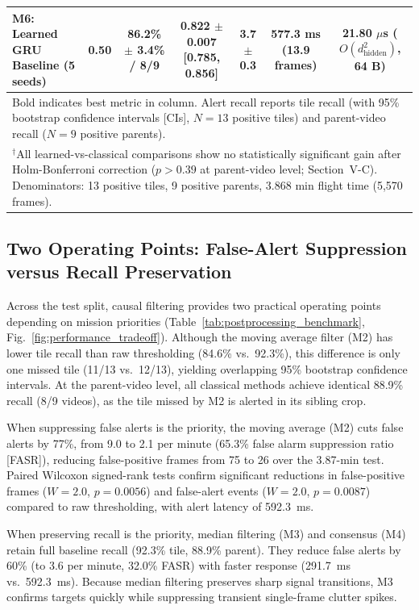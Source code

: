 \documentclass[conference]{IEEEtran}
\begin{document}
\begin{table}[t]
{\begin{tabular}{lcccccc}
M6: Learned GRU Baseline (5 seeds)     & 0.50 & 86.2\% $\pm$ 3.4\% / 8/9                     & \textbf{0.822 $\pm$ 0.007 [0.785, 0.856]} & 3.7 $\pm$ 0.3  & 577.3 ms (13.9 frames)          & 21.80 $\mu$s ($O(d_{\text{hidden}}^2)$, 64 B) \\
\bottomrule
\multicolumn{7}{l}{\footnotesize Bold indicates best metric in column. Alert recall reports tile recall (with 95\% bootstrap confidence intervals [CIs], $N=13$ positive tiles) and parent-video recall ($N=9$ positive parents).} \\
\multicolumn{7}{l}{\footnotesize $^\dagger$All learned-vs-classical comparisons show no statistically significant gain after Holm-Bonferroni correction ($p > 0.39$ at parent-video level; Section~V-C). Denominators: 13 positive tiles, 9 positive parents, 3.868 min flight time (5,570 frames).}
\end{tabular}%
}
\end{table}

\subsection{Two Operating Points: False-Alert Suppression versus Recall Preservation}
Across the test split, causal filtering provides two practical operating points depending on mission priorities (Table~\ref{tab:postprocessing_benchmark}, Fig.~\ref{fig:performance_tradeoff}). Although the moving average filter (M2) has lower tile recall than raw thresholding (84.6\% vs.\ 92.3\%), this difference is only one missed tile (11/13 vs.\ 12/13), yielding overlapping 95\% bootstrap confidence intervals. At the parent-video level, all classical methods achieve identical 88.9\% recall (8/9 videos), as the tile missed by M2 is alerted in its sibling crop.

When suppressing false alerts is the priority, the moving average (M2) cuts false alerts by 77\%, from 9.0 to 2.1 per minute (65.3\% false alarm suppression ratio [FASR]), reducing false-positive frames from 75 to 26 over the 3.87-min test. Paired Wilcoxon signed-rank tests confirm significant reductions in false-positive frames ($W=2.0$, $p=0.0056$) and false-alert events ($W=2.0$, $p=0.0087$) compared to raw thresholding, with alert latency of 592.3~ms.

When preserving recall is the priority, median filtering (M3) and consensus (M4) retain full baseline recall (92.3\% tile, 88.9\% parent). They reduce false alerts by 60\% (to 3.6 per minute, 32.0\% FASR) with faster response (291.7~ms vs.\ 592.3~ms). Because median filtering preserves sharp signal transitions, M3 confirms targets quickly while suppressing transient single-frame clutter spikes.
\end{document}
